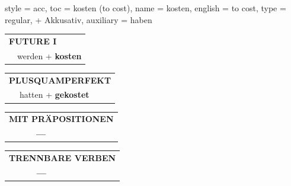 \begin{verbentry}{
  style = {acc},
  toc = {kosten (to cost)},
  name = {kosten},
  english = {to cost},
  type = {regular, + Akkusativ},
  auxiliary = {haben}
}
\begin{tabular}{rl}
    \multicolumn{2}{l}{\textbf{FUTURE I} }\\
   & werden + \textbf{kosten}\\
 
  \end{tabular}
\hfill
   \begin{tabular}{rl}
      \multicolumn{2}{l}{\textbf{PLUSQUAMPERFEKT}}\\
   & hatten + \textbf{gekostet}\\
  \end{tabular}
  
  
\vspace{10pt}

\begin{tabular}{lll}
\multicolumn{3}{l}{\textbf{MIT PRÄPOSITIONEN}}\\
& \textbf{---} & \\
\end{tabular}
\hfill
\begin{tabular}{lll}
\multicolumn{3}{l}{\textbf{TRENNBARE VERBEN}}\\
& \textbf{---} & \\
\end{tabular}
\vspace{-5pt}
\end{verbentry}

